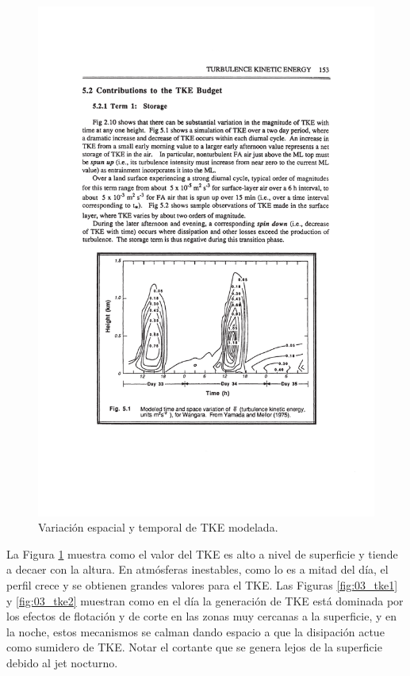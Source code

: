 \begin{figure}[h!]
	\centering
		\includegraphics[width=0.8\linewidth,trim={3cm 5.5cm 2.9cm 11.6cm},clip]{Imagenes/03/tke3}
	\caption{Variación espacial y temporal de TKE modelada.}
	\label{fig:03_tke3}
\end{figure}

La Figura \ref{fig:03_tke3} muestra como el valor del TKE es alto a nivel de superficie y tiende a decaer con la altura. En atmósferas inestables, como lo es a mitad del día, el perfil crece y se obtienen grandes valores para el TKE. Las Figuras \ref{fig:03_tke1} y \ref{fig:03_tke2} muestran como en el día la generación de TKE está dominada por los efectos de flotación y de corte en las zonas muy cercanas a la superficie, y en la noche, estos mecanismos se calman dando espacio a que la disipación actue como sumidero de TKE. Notar el cortante que se genera lejos de la superficie debido al jet nocturno.

